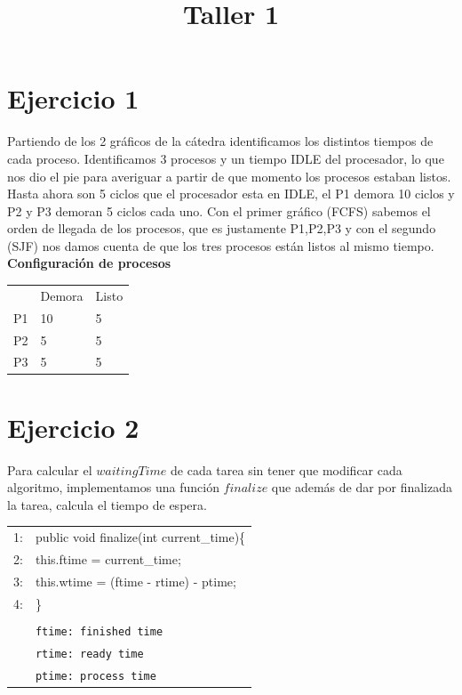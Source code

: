 \documentclass[a4paper, 10pt]{article}
\title{Taller 1}
\begin{document}
\maketitle

\newpage

\section{Ejercicio 1}
  Partiendo de los 2 gr\'aficos de la c\'atedra identificamos los distintos tiempos de cada proceso. Identificamos 3 procesos y un tiempo IDLE del procesador, lo que nos dio el pie para averiguar a partir de que momento los procesos estaban listos. \newline
  Hasta ahora son 5 ciclos que el procesador esta en IDLE, el P1 demora 10 ciclos y P2 y P3 demoran 5 ciclos cada uno.
  Con el primer gr\'afico (FCFS) sabemos el orden de llegada de los procesos, que es justamente P1,P2,P3 y con el segundo (SJF) nos damos cuenta de que los tres procesos est\'an listos al mismo tiempo.\\

 \textbf{  Configuraci\'on de procesos}
  \begin{center}
  	\begin{tabular}{lll}
  		& Demora & Listo \\
  		P1 & 10 & 5 \\
  		P2 & 5 & 5 \\
  		P3 & 5 & 5 \\
  	\end{tabular}
  \end{center}



\section{Ejercicio 2}

  Para calcular el $waitingTime$ de cada tarea sin tener que modificar cada algoritmo, implementamos una funci\'on $finalize$ que adem\'as de dar por finalizada la tarea, calcula el tiempo de espera. \\

\begin{tabular}{rp{12cm}}
1: & public void finalize(int current\_time)\{\\
2: & \hspace{0,5cm} 	this.ftime = current\_time;\\
3: & \hspace{0,5cm} 	this.wtime = (ftime - rtime) - ptime;\\
4: & \}\\
 & \\ 
 & \texttt{ftime: finished time} \\
 & \texttt{rtime: ready time} \\
 & \texttt{ptime: process time} \\
\end{tabular}\\
\end{document}
